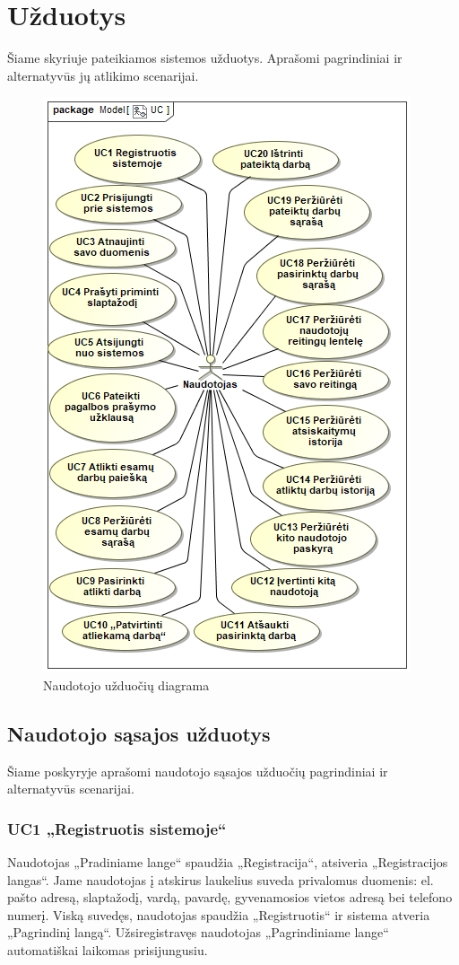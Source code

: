 \documentclass{VUMIFPSbakalaurinis}
\begin{document}
\section{Užduotys}
Šiame skyriuje pateikiamos sistemos užduotys. Aprašomi pagrindiniai ir alternatyvūs jų atlikimo scenarijai.
\begin{figure}[H]
    \centering
    \includegraphics[scale=0.8]{img/UC}
    \caption{Naudotojo užduočių diagrama}
    \label{img:uc}
\end{figure}

\subsection{Naudotojo sąsajos užduotys}
Šiame poskyryje aprašomi naudotojo sąsajos užduočių pagrindiniai ir alternatyvūs scenarijai.
\subsubsection{UC1 „Registruotis sistemoje“}
Naudotojas „Pradiniame lange“ spaudžia „Registracija“, atsiveria „Registracijos langas“. Jame naudotojas į atskirus laukelius suveda privalomus duomenis: el. pašto adresą, slaptažodį, vardą, pavardę, gyvenamosios vietos adresą bei telefono numerį. Viską suvedęs, naudotojas spaudžia „Registruotis“ ir sistema atveria „Pagrindinį langą“. Užsiregistravęs naudotojas „Pagrindiniame lange“ automatiškai laikomas prisijungusiu.
\end{document}
